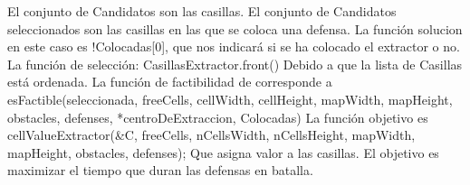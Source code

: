 El conjunto de Candidatos son las casillas.
\newline
El conjunto de Candidatos seleccionados son las casillas en las que se coloca una defensa.
\newline
La función solucion en este caso es !Colocadas[0], que nos indicará si se ha colocado el extractor o no.
\newline
La función de selección: CasillasExtractor.front() Debido a que la lista de Casillas está ordenada.
\newline
La función de factibilidad de corresponde a esFactible(seleccionada, freeCells, cellWidth, cellHeight, mapWidth, mapHeight, obstacles, defenses, *centroDeExtraccion, Colocadas)
\newline
La función objetivo es cellValueExtractor(\&C, freeCells, nCellsWidth, nCellsHeight, mapWidth, mapHeight, obstacles, defenses);
Que asigna valor a las casillas.
El objetivo es maximizar el tiempo que duran las defensas en batalla.